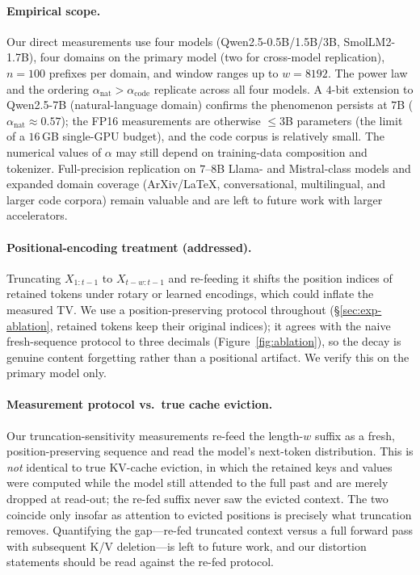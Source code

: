 \documentclass[11pt]{article}
\theoremstyle{plain}
\theoremstyle{definition}
\theoremstyle{remark}
\begin{document}
\paragraph{Empirical scope.}
Our direct measurements use four models (Qwen2.5-0.5B/1.5B/3B,
SmolLM2-1.7B), four domains on the primary model (two for cross-model
replication), $n = 100$ prefixes per domain, and window ranges up to
$w = 8192$. The power law and the ordering
$\alpha_{\text{nat}} > \alpha_{\text{code}}$ replicate across all
four models. A $4$-bit extension to Qwen2.5-7B (natural-language
domain) confirms the phenomenon persists at $7$B
($\alpha_{\text{nat}} \approx 0.57$); the FP16 measurements are
otherwise $\le 3$B parameters (the limit of a $16$\,GB single-GPU
budget), and the code corpus is relatively small. The
numerical values of $\alpha$ may still depend on training-data
composition and tokenizer. Full-precision replication on $7$--$8$B Llama- and
Mistral-class models and expanded domain coverage (ArXiv/LaTeX,
conversational, multilingual, and larger code corpora) remain
valuable and are left to future work with larger accelerators.

\paragraph{Positional-encoding treatment (addressed).}
Truncating $X_{1:t-1}$ to $X_{t-w:t-1}$ and re-feeding it shifts the
position indices of retained tokens under rotary or learned
encodings, which could inflate the measured TV. We use a
position-preserving protocol throughout (\S\ref{sec:exp-ablation},
retained tokens keep their original indices); it agrees with the
naive fresh-sequence protocol to three decimals
(Figure~\ref{fig:ablation}), so the decay is genuine content
forgetting rather than a positional artifact. We verify this on the
primary model only.

\paragraph{Measurement protocol vs.\ true cache eviction.}
Our truncation-sensitivity measurements re-feed the length-$w$ suffix
as a fresh, position-preserving sequence and read the model's
next-token distribution. This is \emph{not} identical to true KV-cache
eviction, in which the retained keys and values were computed while
the model still attended to the full past and are merely dropped at
read-out; the re-fed suffix never saw the evicted context. The two
coincide only insofar as attention to evicted positions is precisely
what truncation removes. Quantifying the gap---re-fed truncated
context versus a full forward pass with subsequent K/V deletion---is
left to future work, and our distortion statements should be read
against the re-fed protocol.
\end{document}
